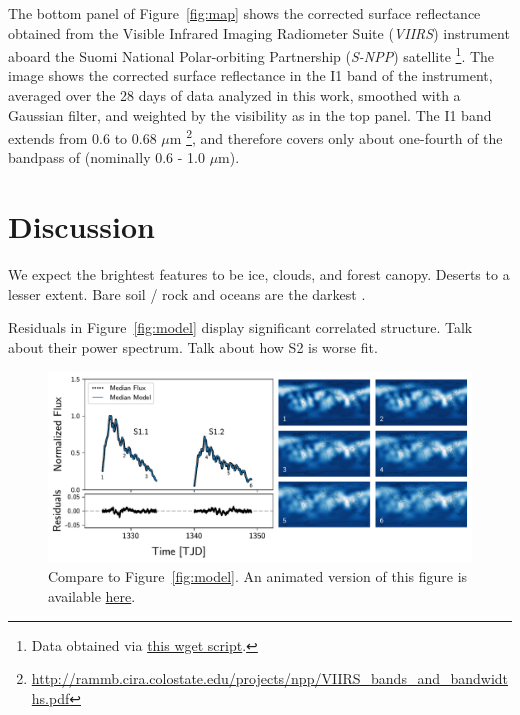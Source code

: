 \documentclass[modern]{aastex62}
\begin{document}
The bottom panel of Figure~\ref{fig:map} shows the corrected surface
reflectance obtained from the
Visible Infrared Imaging Radiometer Suite (\emph{VIIRS}) instrument aboard the 
Suomi National Polar-orbiting Partnership (\emph{S-NPP}) satellite
\footnote{Data obtained via 
\href{https://github.com/rodluger/earthshine/blob/master/tex/figures/viirs.sh}{this wget script}.}. 
The image shows the corrected surface reflectance in the I1 band of the instrument,
averaged over the 28 days of data analyzed in this work, smoothed with a Gaussian
filter, and weighted by the \tess visibility as in the top panel.
The I1 band extends from 0.6 to 0.68 $\mu\mathrm{m}$
\footnote{\url{http://rammb.cira.colostate.edu/projects/npp/VIIRS_bands_and_bandwidths.pdf}},
and therefore covers only about one-fourth of the bandpass of \tess
(nominally 0.6 - 1.0 $\mu\mathrm{m}$).


\section{Discussion}
\label{sec:discussion}

We expect the brightest features to be ice, clouds, and forest canopy. Deserts
to a lesser extent. Bare soil / rock and oceans are the darkest \citep{Jedlovec2009}.

Residuals in Figure~\ref{fig:model} display significant correlated
structure. Talk about their power spectrum. Talk about how S2 is worse fit.

\begin{figure}[t!]
    \begin{centering}
    \includegraphics[width=\linewidth]{figures/map_temporal.pdf}
    \caption{\label{fig:map_temporal}
             Compare to Figure~\ref{fig:model}. An animated version
             of this figure is available 
             \href{https://github.com/rodluger/earthshine/blob/master/tex/figures/map_temporal.mp4}{here}.
             }
    \end{centering}
\end{figure}
\end{document}
